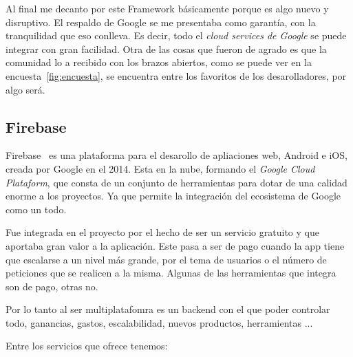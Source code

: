 Al final me decanto por este Framework básicamente porque es algo nuevo y disruptivo. El respaldo de Google se me presentaba como garantía, con la tranquilidad que eso conlleva. Es decir, todo el \emph{cloud services de Google} se puede integrar con gran facilidad.
Otra de las cosas que fueron de agrado es que la comunidad lo a recibido con los brazos abiertos, como se puede ver en la encuesta~\ref{fig:encuesta}, se encuentra entre los favoritos de los desarolladores, por algo será.

\subsection{Firebase}
Firebase~\cite{wiki:firebase} es una plataforma para el desarollo de apliaciones web, Android e iOS, creada por Google en el 2014. Esta en la nube, formando el \emph{Google Cloud Plataform}, que consta de un conjunto de herramientas para dotar de una calidad enorme a los proyectos. Ya que permite la integración del ecosistema de Google como un todo.

Fue integrada en el proyecto por el hecho de ser un servicio gratuito y que aportaba gran valor a la aplicación. Este pasa a ser de pago cuando la app tiene que escalarse a un nivel más grande, por el tema de usuarios o el número de peticiones que se realicen a la misma. Algunas de las herramientas que integra son de pago, otras no.

Por lo tanto al ser multiplatafomra es un backend con el que poder controlar todo, ganancias, gastos, escalabilidad, nuevos productos, herramientas ... 

Entre los servicios que ofrece tenemos:

